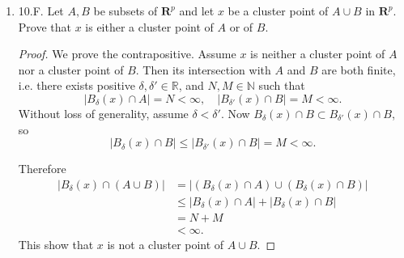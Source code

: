 \begin{enumerate}
\begin{proof}
Now we prove that $0$ is a cluster point. Take any $\delta>0$, and by the claim above, $A \setminus B_\delta(0)$ is finite. Since $A$ is infinite, $A \cap B_\delta(0)$ is infinite, and we are done.

Finally we verify that $0$ is the only cluster point. Take any $x \in \mathbb{R}$ such that $x \neq 0$. Now let $\delta = \frac{|x|}{2}$. Now we have $B_\delta(x) \subset A \setminus B_\delta(0)$. Hence $B_\delta(x) \cap A$ is finite, which means that $x$ is not a boundary point.
\end{proof}

	\item 10.F. Let $A, B$ be subsets of $\boldsymbol{R}^p$ and let $x$ be a cluster point of $A \cup B$ in $\boldsymbol{R}^p$. Prove that $x$ is either a cluster point of $A$ or of $B$.
\begin{proof}
	We prove the contrapositive. Assume $x$ is neither a cluster point of $A $ nor a cluster point of $B$. Then its intersection with $A$ and $B$ are both finite, i.e. there exists positive $\delta, \delta' \in \mathbb{R}$, and $N, M \in \mathbb{N}$ such that \[
		|B_\delta(x) \cap A|  = N < \infty , \quad
	|B_{\delta'}(x) \cap B| = M < \infty 
	.\] 
	Without loss of generality, assume $\delta<\delta'$. Now $B_\delta(x) \cap B \subset B_{\delta'}(x) \cap B$, so \[
		|B_\delta(x) \cap B| 
		\le |B_{\delta'}(x) \cap B|
		= M
		< \infty  
	.\] 

	Therefore \begin{align*}
		|B_\delta(x) \cap (A \cup B)|
		&= \left|\left( B_\delta(x) \cap A \right) 
		\cup  \left( B_\delta(x) \cap B \right) \right|\\
		&\le |B_\delta(x) \cap A|
		+ |B_\delta(x) \cap B|\\
		&= N + M \\
		&< \infty 
	.\end{align*}
	This show that $x$ is not a cluster point of $A \cup B$.
\end{proof}


\end{enumerate}

